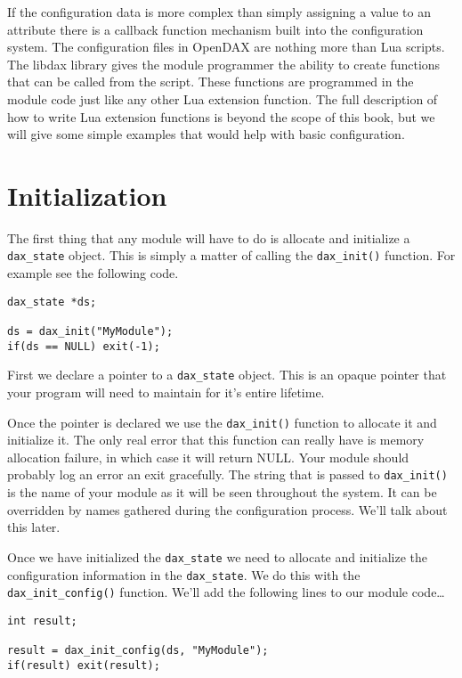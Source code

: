 If the configuration data is more complex than simply assigning a value to an
attribute there is a callback function mechanism built into the configuration
system.  The configuration files in OpenDAX are nothing more than Lua scripts.
The libdax library gives the module programmer the ability to create functions
that can be called from the script.  These functions are programmed in the
module code just like any other Lua extension function.  The full description of
how to write Lua extension functions is beyond the scope of this book, but we
will give some simple examples that would help with basic configuration.

\section{Initialization}

The first thing that any module will have to do is allocate and initialize a
\verb|dax_state| object.  This is simply a matter of
calling the \verb|dax_init()| function.  For example
see the following code.

\begin{verbatim}
dax_state *ds;

ds = dax_init("MyModule");
if(ds == NULL) exit(-1);
\end{verbatim}

First we declare a pointer to a \verb|dax_state| object.  This is an opaque
pointer that your program will need to maintain for it's entire lifetime.

Once the pointer is declared we use the \verb|dax_init()| function to allocate
it and initialize it.  The only real error that this function can really have is
memory allocation failure, in which case it will return NULL.  Your module
should probably log an error an exit gracefully.  The string that is passed to
\verb|dax_init()| is the name of your module as it will be seen throughout the
system.  It can be overridden by names gathered during the configuration
process.  We'll talk about this later.

Once we have initialized the \verb|dax_state| we need to allocate and initialize
the configuration information in the \verb|dax_state|.  We do this with the
\verb|dax_init_config()| function.  We'll
add the following lines to our module code\ldots

\begin{verbatim}
int result;

result = dax_init_config(ds, "MyModule");
if(result) exit(result);
\end{verbatim}

